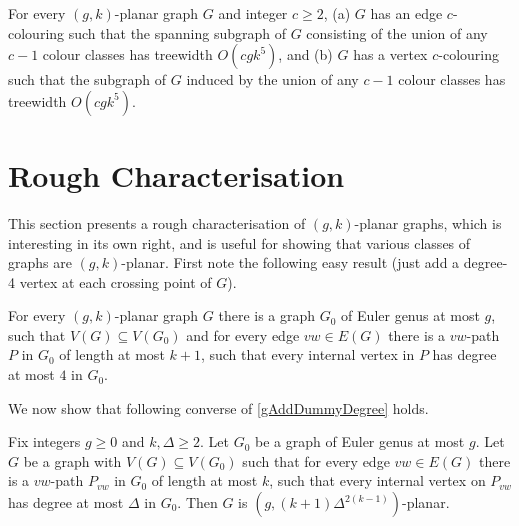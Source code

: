 \documentclass{patmorin}
\newcommand{\PP}{\mathcal{P}}
\renewcommand{\geq}{\geqslant}
\begin{document}
\begin{prop}
For every $(g,k)$-planar graph $G$ and integer $c\geq 2$, 
(a) $G$ has an edge $c$-colouring such that the spanning subgraph of $G$ consisting of the union of any $c-1$ colour classes has treewidth $O(cgk^5 )$, and (b) $G$ has a vertex $c$-colouring such that the subgraph of $G$ induced by the union of any $c-1$ colour classes has treewidth $O(cgk^5 )$.
\end{prop}


%

\section{Rough Characterisation}
\label{Characterisation}

This section presents a rough characterisation of $(g,k)$-planar graphs, which is interesting in its own right, and is useful for showing that various classes of graphs are $(g,k)$-planar. First note the following easy result (just add a degree-4 vertex at each crossing point of $G$). 

\begin{lem}
\label{gAddDummyDegree}
For every $(g,k)$-planar graph $G$ there is a graph $G_0$ of Euler
genus at most $g$, such that $V(G) \subseteq V(G_0)$ and for every
edge $vw \in E(G)$ there is a $vw$-path $P$ in $G_0$ of length at most
$k+1$, such that every internal vertex in $P$ has degree at most $4$
in $G_0$.
\end{lem}



We now show that following converse of \cref{gAddDummyDegree}  holds.

\begin{lem} 
\label{DrawG}
Fix integers $g\geq 0$ and $k,\Delta\geq 2$. 
Let $G_0$ be a graph of Euler genus at most $g$. Let $G$ be
a graph with $V(G) \subseteq V(G_0)$ such that for every edge $vw \in
E(G)$ there is a $vw$-path $P_{vw}$ in $G_0$ of length at most $k$, such
that every internal vertex on $P_{vw}$ has degree at most $\Delta$ in
$G_0$. Then $G$ is $(g, (k+1)\Delta^{2(k-1)} )$-planar.
\end{lem}
\end{document}
